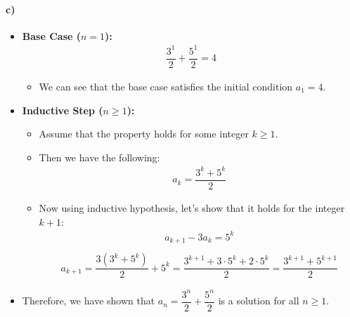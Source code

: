 \documentclass[12pt]{article}
\begin{document}
\paragraph*{c)}
\begin{itemize}
    \item \textbf{Base Case ($n = 1$):}
    \begin{equation*}
        \begin{split}
            \dfrac{3^1}{2} + \dfrac{5^1}{2} = 4
        \end{split}
    \end{equation*}
    \begin{itemize}
        \item We can see that the base case satisfies the initial condition $a_1 = 4$.
    \end{itemize}
    \item \textbf{Inductive Step ($n \geq 1$):}
    \begin{itemize}
        \item Assume that the property holds for some integer $k \geq 1$.
        \item Then we have the following:
        \begin{equation*}
            \begin{split}
                a_k = \dfrac{3^k + 5^k}{2}
            \end{split}
        \end{equation*}
        \item Now using inductive hypothesis, let's show that it holds for the integer $k+1$:
        \begin{equation*}
            \begin{split}
                a_{k+1} - 3a_k = 5^k\\
            \end{split}
        \end{equation*}
        \begin{equation*}
            \begin{split}
                a_{k+1} = \dfrac{3(3^k + 5^k)}{2} + 5^k = \dfrac{3^{k+1} + 3\cdot5^k + 2\cdot5^k}{2} = \dfrac{3^{k+1} + 5^{k+1}}{2}
            \end{split}
        \end{equation*}
    \end{itemize}
    \item Therefore, we have shown that $a_n = \dfrac{3^n}{2} + \dfrac{5^n}{2}$ is a solution for all $n \geq 1$.
\end{itemize}
\end{document}
